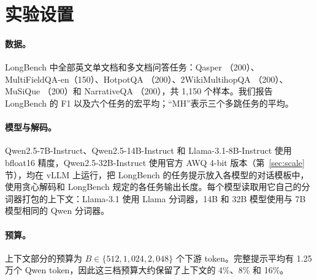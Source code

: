 \documentclass[11pt]{article}
\begin{document}
\section{实验设置}
\label{sec:setup}

\paragraph{数据。}LongBench \citep{bai2023longbench} 中全部英文单文档和多文档问答任务：Qasper \citep{dasigi2021qasper}（200）、MultiFieldQA-en（150）、HotpotQA \citep{yang2018hotpotqa}（200）、2WikiMultihopQA \citep{ho2020constructing}（200）、MuSiQue \citep{trivedi2022musique}（200）和 NarrativeQA \citep{kocisky2018narrativeqa}（200），共 1,150 个样本。我们报告 LongBench 的 F1 以及六个任务的宏平均；“MH”表示三个多跳任务的平均。

\paragraph{模型与解码。}Qwen2.5-7B-Instruct、Qwen2.5-14B-Instruct \citep{qwen2025qwen25} 和 Llama-3.1-8B-Instruct \citep{grattafiori2024llama3} 使用 bfloat16 精度，Qwen2.5-32B-Instruct 使用官方 AWQ 4-bit 版本（第~\ref{sec:scale} 节），均在 vLLM 上运行，把 LongBench 的任务提示放入各模型的对话模板中，使用贪心解码和 LongBench 规定的各任务输出长度。每个模型读取用它自己的分词器打包的上下文：Llama-3.1 使用 Llama 分词器，14B 和 32B 模型使用与 7B 模型相同的 Qwen 分词器。

\paragraph{预算。}上下文部分的预算为 $B\in\{512, 1{,}024, 2{,}048\}$ 个下游 token。完整提示平均有 1.25 万个 Qwen token，因此这三档预算大约保留了上下文的 4\%、8\% 和 16\%。
\end{document}
